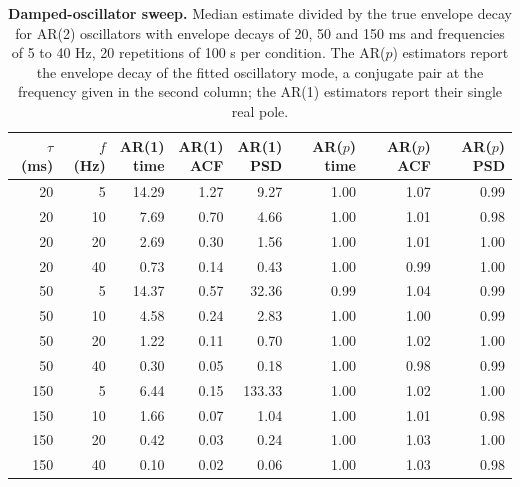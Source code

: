 \begin{table}[h]
\caption{\textbf{Damped-oscillator sweep.} Median estimate divided by the true envelope decay for AR(2) oscillators with envelope decays of 20, 50 and 150 ms and frequencies of 5 to 40 Hz, 20 repetitions of 100 s per condition. The AR($p$) estimators report the envelope decay of the fitted oscillatory mode, a conjugate pair at the frequency given in the second column; the AR(1) estimators report their single real pole.}\label{tab:s_damped}
\setlength{\tabcolsep}{3pt}
\begin{tabular}{rrrrrrrr}
\toprule
\shortstack[c]{$\tau$ \\ (ms)} & \shortstack[c]{$f$ \\ (Hz)} & \shortstack[c]{AR(1) \\ time} & \shortstack[c]{AR(1) \\ ACF} & \shortstack[c]{AR(1) \\ PSD} & \shortstack[c]{AR($p$) \\ time} & \shortstack[c]{AR($p$) \\ ACF} & \shortstack[c]{AR($p$) \\ PSD} \\
\midrule
20 & 5 & 14.29 & 1.27 & 9.27 & 1.00 & 1.07 & 0.99 \\
20 & 10 & 7.69 & 0.70 & 4.66 & 1.00 & 1.01 & 0.98 \\
20 & 20 & 2.69 & 0.30 & 1.56 & 1.00 & 1.01 & 1.00 \\
20 & 40 & 0.73 & 0.14 & 0.43 & 1.00 & 0.99 & 1.00 \\
50 & 5 & 14.37 & 0.57 & 32.36 & 0.99 & 1.04 & 0.99 \\
50 & 10 & 4.58 & 0.24 & 2.83 & 1.00 & 1.00 & 0.99 \\
50 & 20 & 1.22 & 0.11 & 0.70 & 1.00 & 1.02 & 1.00 \\
50 & 40 & 0.30 & 0.05 & 0.18 & 1.00 & 0.98 & 0.99 \\
150 & 5 & 6.44 & 0.15 & 133.33 & 1.00 & 1.02 & 1.00 \\
150 & 10 & 1.66 & 0.07 & 1.04 & 1.00 & 1.01 & 0.98 \\
150 & 20 & 0.42 & 0.03 & 0.24 & 1.00 & 1.03 & 1.00 \\
150 & 40 & 0.10 & 0.02 & 0.06 & 1.00 & 1.03 & 0.98 \\
\bottomrule
\end{tabular}
\end{table}
